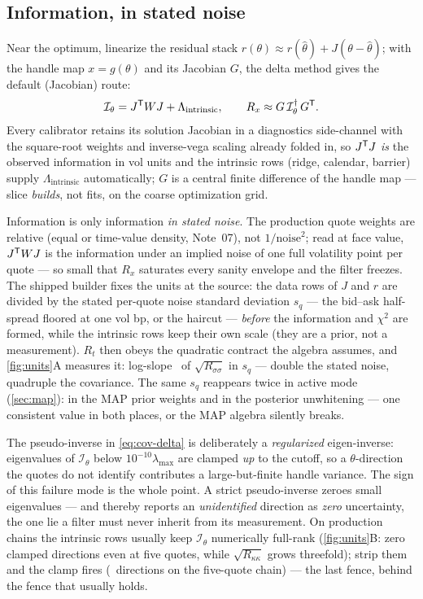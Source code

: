 \documentclass[11pt]{article}
\newcommand{\calI}{\mathcal I}
\begin{document}
\subsection{Information, in stated noise}
\label{sec:units}

Near the optimum, linearize the residual stack $r(\theta)\approx
r(\hat\theta)+J(\theta-\hat\theta)$; with the handle map $x=g(\theta)$
and its Jacobian $G$, the delta method gives the default (Jacobian)
route:
\begin{equation}
\calI_\theta=J\T WJ+\Lambda_{\mathrm{intrinsic}},
\qquad
R_x\approx G\,\calI_\theta\pinv\,G\T .
\label{eq:cov-delta}
\end{equation}
Every calibrator retains its solution Jacobian in a diagnostics
side-channel with the square-root weights and inverse-vega scaling
already folded in, so $J^{\mathsf{T}} J$ \emph{is} the observed information in vol
units and the intrinsic rows (ridge, calendar, barrier) supply
$\Lambda_{\mathrm{intrinsic}}$ automatically; $G$ is a central finite
difference of the handle map --- slice \emph{builds}, not fits, on the
coarse optimization grid.

\begin{caution}
Information is only information \emph{in stated noise}.  The production
quote weights are relative (equal or time-value density, Note~07), not
$1/\text{noise}^2$; read at face value, $J^{\mathsf{T}} WJ$ is the information
under an implied noise of one full volatility point per quote --- so
small that $R_x$ saturates every sanity envelope and the filter freezes.
The shipped builder fixes the units at the source: the data rows of $J$
and $r$ are divided by the stated per-quote noise standard deviation
$s_q$ --- the bid--ask half-spread floored at one vol bp, or the haircut
--- \emph{before} the information and $\chi^2$ are formed, while the
intrinsic rows keep their own scale (they are a prior, not a
measurement).  $R_t$ then obeys the quadratic contract the algebra
assumes, and \cref{fig:units}A measures it: log-slope \ktrunitslope\
of $\sqrt{R_{\sigma\sigma}}$ in $s_q$ --- double the stated noise,
quadruple the covariance.  The same $s_q$ reappears twice in active mode
(\cref{sec:map}): in the MAP prior weights and in the posterior
unwhitening --- one consistent value in both places, or the MAP algebra
silently breaks.
\end{caution}

The pseudo-inverse in \cref{eq:cov-delta} is deliberately a
\emph{regularized} eigen-inverse: eigenvalues of $\calI_\theta$ below
$10^{-10}\lambda_{\max}$ are clamped \emph{up} to the cutoff, so a
$\theta$-direction the quotes do not identify contributes a
large-but-finite handle variance.  The sign of this failure mode is the
whole point.  A strict pseudo-inverse zeroes small eigenvalues --- and
thereby reports an \emph{unidentified} direction as \emph{zero}
uncertainty, the one lie a filter must never inherit from its
measurement.  On production chains the intrinsic rows usually keep
$\calI_\theta$ numerically full-rank (\cref{fig:units}B: zero clamped
directions even at five quotes, while $\sqrt{R_{\kappa\kappa}}$ grows
threefold); strip them and the clamp fires (\ktrclampnoreg\ directions
on the five-quote chain) --- the last fence, behind the fence that
usually holds.
\end{document}
